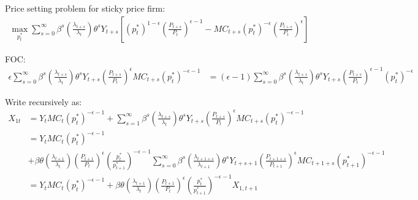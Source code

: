 \documentclass[11pt]{article}
\begin{document}
Price setting problem for sticky price firm:
\begin{align*}
	\max_{p_t^*} \sum_{s=0}^{\infty} \beta^s\left(\frac{\lambda_{t+s}}{\lambda_t}\right)\theta^{s}Y_{t+s}\left[(p_t^*)^{1-\epsilon} \left(\frac{P_{t+s}}{P_t}\right)^{\epsilon-1}  - MC_{t+s} (p_t^*)^{-\epsilon}\left(\frac{P_{t+s}}{P_t}\right)^{\epsilon}\right]
\end{align*}

FOC:
\begin{align*}
	\epsilon\sum_{s=0}^{\infty} \beta^s\left(\frac{\lambda_{t+s}}{\lambda_t}\right)\theta^{s} Y_{t+s} \left(\frac{P_{t+s}}{P_t}\right)^{\epsilon} MC_{t+s} (p_t^*)^{-\epsilon-1} 
	&=(\epsilon-1)\sum_{s=0}^{\infty} \beta^s\left(\frac{\lambda_{t+s}}{\lambda_t}\right)\theta^{s}Y_{t+s}\left(\frac{P_{t+s}}{P_t}\right)^{\epsilon-1}  (p_t^*)^{-\epsilon} 
\end{align*}

Write recursively as:
\begin{align*}
	X_{1t} & =  Y_t MC_{t} (p_t^*)^{-\epsilon-1} + \sum_{s=1}^{\infty}\beta^s \left(\frac{\lambda_{t+s}}{\lambda_t}\right)\theta^{s}Y_{t+s} \left(\frac{P_{t+s}}{P_t}\right)^{\epsilon} MC_{t+s} (p_t^*)^{-\epsilon-1} \\ 
	& = Y_{t} MC_{t} (p_t^*)^{-\epsilon-1} \\
	&+ \beta\theta \left(\frac{\lambda_{t+1}}{\lambda_t}\right)  \left(\frac{P_{t+1}}{P_{t}}\right)^{\epsilon} \left(\frac{p_t^*}{p_{t+1}^*}\right)^{-\epsilon-1}  \sum_{s=0}^{\infty}\beta^s \left(\frac{\lambda_{t+1+s}}{\lambda_{t+1}}\right)\theta^{s} Y_{t+s+1} \left(\frac{P_{t+1+s}}{P_{t+1}}\right)^{\epsilon} MC_{t+1+s} (p_{t+1}^*)^{-\epsilon-1} \\ 
	& = Y_{t} MC_{t} (p_t^*)^{-\epsilon-1} + \beta\theta  \left(\frac{\lambda_{t+1}}{\lambda_{t}}\right)\left(\frac{P_{t+1}}{P_{t}}\right)^{\epsilon} \left(\frac{p_t^*}{p_{t+1}^*}\right)^{-\epsilon-1}  X_{1,t+1} \\ 
\end{align*}
\end{document}
